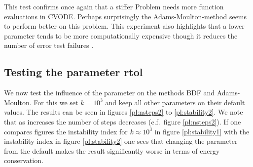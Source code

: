 \documentclass{scrartcl}
\begin{document}
This test confirms once again that a stiffer Problem needs more function evaluations in CVODE.
Perhaps surprisingly the Adams-Moulton-method seems to perform better on this problem.
This experiment also highlights that a lower  parameter tends to be more computationally expensive though it reduces the number of error test failures .

\subsection*{Testing the parameter rtol}
We now test the influence of the parameter  on the methods BDF and Adams-Moulton. For this we set $k=10^3$ and keep all other parameters on their default values. The results can be seen in figures \ref{pl:nsteps2} to \ref{pl:stability2}. We note that as  increases the number of steps decreases (c.f.\ figure \ref{pl:nsteps2}). If one compares figures the instability index for $k\approx10^3$ in figure \ref{pl:stability1} with the instability index in figure \ref{pl:stability2} one sees that changing the  parameter from the default makes the result significantly worse in terms of energy conservation.
\end{document}
